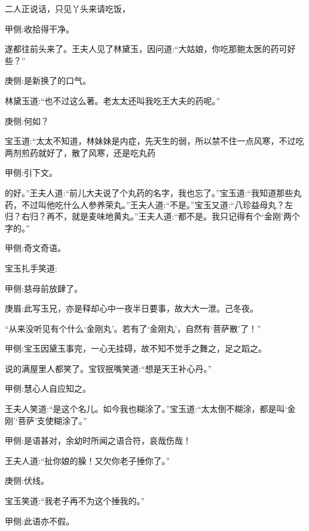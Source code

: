 \begin{parag}
    二人正说话，只见丫头来请吃饭，\begin{note}甲侧:收拾得干净。\end{note}遂都往前头来了。王夫人见了林黛玉，因问道:“大姑娘，你吃那鲍太医的药可好些？”\begin{note}庚侧:是新换了的口气。\end{note}林黛玉道:“也不过这么著。老太太还叫我吃王大夫的药呢。”\begin{note}庚侧:何如？\end{note}宝玉道:“太太不知道，林妹妹是内症，先天生的弱，所以禁不住一点风寒，不过吃两剂煎药就好了，散了风寒，还是吃丸药\begin{note}甲侧:引下文。\end{note}的好。”王夫人道:“前儿大夫说了个丸药的名字，我也忘了。”宝玉道:“我知道那些丸药，不过叫他吃什么人参养荣丸。”王夫人道:“不是。”宝玉又道:“八珍益母丸？左归？右归？再不，就是麦味地黄丸。”王夫人道:“都不是。我只记得有个‘金刚’两个字的。”\begin{note}甲侧:奇文奇语。\end{note}宝玉扎手笑道:\begin{note}甲侧:慈母前放肆了。\end{note}\begin{note}庚眉:此写玉兄，亦是释却心中一夜半日要事，故大大一泄。己冬夜。\end{note}“从来没听见有个什么‘金刚丸’。若有了‘金刚丸’，自然有‘菩萨散’了！”\begin{note}甲侧:宝玉因黛玉事完，一心无挂碍，故不知不觉手之舞之，足之蹈之。\end{note}说的满屋里人都笑了。宝钗抿嘴笑道:“想是天王补心丹。”\begin{note}甲侧:慧心人自应知之。\end{note}王夫人笑道:“是这个名儿。如今我也糊涂了。”宝玉道:“太太倒不糊涂，都是叫‘金刚’‘菩萨’支使糊涂了。”\begin{note}甲侧:是语甚对，余幼时所闻之语合符，哀哉伤哉！\end{note}王夫人道:“扯你娘的臊！又欠你老子捶你了。”\begin{note}庚侧:伏线。\end{note}宝玉笑道:“我老子再不为这个捶我的。”\begin{note}甲侧:此语亦不假。\end{note}
\end{parag}


